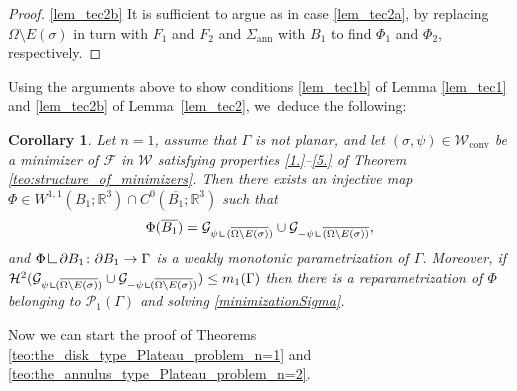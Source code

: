 \documentclass[JEP,XML,SOM,Unicode, NoFloatCountersInSection,published]{cedram}
\newcommand{\R}{\mathbb{R}}
\let\Om\Omega
\newcommand\admclassconv{{\mathcal W_\mathrm{conv}}}
\newcommand{\openannulus}{\Sigma_\mathrm{ann}}
\newcommand{\resa}{\mathop{\hbox{\vrule height 7pt width 0.5pt depth 0pt
\vrule height 0.5pt width 6pt depth 0pt}}\nolimits}
\newcommand{\resb}{\mathop{\hbox{\vrule height 4pt width 0.5pt depth 0pt
\vrule height 0.5pt width 3pt depth 0pt}}\nolimits}
\newcommand{\res}{\mathchoice{\resa}{\resa}{\resb}{\resb}}
\newtheorem{cor}[theorem]{Corollary}
\theoremstyle{definition}
\begin{document}
\begin{proof}
\ref{lem_tec2b}
It is sufficient to argue as in case \ref{lem_tec2a},
by replacing $\Omega\setminus E(\sigma)$ in turn with $F_1$ and $F_2$ and
$\openannulus$ with $B_1$ to find $\Phi_1$ and $\Phi_2$, respectively.
\end{proof}

Using the arguments above to show conditions \ref{lem_tec1b} of Lemma \ref{lem_tec1} and \ref{lem_tec2b} of Lem\-ma~\ref{lem_tec2}, we~deduce the following:

\begin{cor}\label{lem_tec3}
Let $n=1$, assume that $\Gamma$ is not planar, and let $(\sigma,\psi)\in\admclassconv$ be a minimizer of
$\mathcal F$ in
$\mathcal W$
satisfying properties \ref{1.}--\ref{5.} of Theorem \ref{teo:structure_of_minimizers}. Then there exists an injective map $\Phi\in W^{1,1}(B_1;\R^3)\cap C^0(\overline{B_1};\R^3)$ such that
\[
\Phi(\overline{B_1})=\mathcal G_{\psi\res {(\overline{\Om\setminus E(\sigma)})}}
\cup\mathcal G_{-\psi\res{\overline{(\Om\setminus E(\sigma))}}},
\]
and $\Phi\res \partial B_1\colon\partial B_1\to \Gamma$ is a weakly monotonic parametrization of $\Gamma$. Moreover, if $\mathcal H^2(\mathcal G_{\psi\res (\overline{\Om\setminus E(\sigma)})}
\cup\mathcal G_{-\psi\res(\overline{\Om\setminus E(\sigma)})})\leq m_1(\Gamma)$ then there is a reparametrization
of $\Phi$ belonging to $\mathcal P_1(\Gamma)$ and solving \eqref{minimizationSigma}.
\end{cor}

Now we can start the proof of Theorems \ref{teo:the_disk_type_Plateau_problem_n=1} and
\ref{teo:the_annulus_type_Plateau_problem_n=2}.

\end{document}
